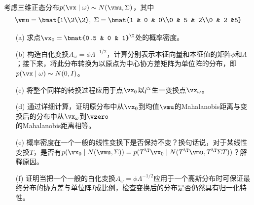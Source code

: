 \documentclass[reportComp]{thesis}
\begin{document}
\begin{question}[\textsection 2 Q23]
考虑三维正态分布$p(\vx\mid\omega)\thicksim N(\vmu,\Sigma)$，其中
\[\vmu=\bmat{1\\2\\2},\;\Sigma=\bmat{1 & 0 & 0\\0 & 5 & 2\\0 & 2 &5}\]
\begin{itemize}
	\item [(a)] 求点$\vx_0=\bmat{0.5 & 0 & 1}^\T$处的概率密度。
	\item [(b)] 构造白化变换$A_\omega=\phi\Lambda^{-1/2}$，计算分别表示本征向量和本征值的矩阵$\phi$和$\Lambda$；接下来，将此分布转换为以原点为中心协方差矩阵为单位阵的分布，即$p(\vx\mid\omega)\thicksim N(0,I)$。
	\item [(c)] 将整个同样的转换过程应用于点$\vx_0$以产生一变换点$\vx_\omega$。
	\item [(d)] 通过详细计算，证明原分布中从$\vx_0$到均值$\vmu$的Mahalanobis距离与变换后的分布中从$\vx_\omega$到$\vzero$\\的Mahalanobis距离相等。
	\item [(e)] 概率密度在一个一般的线性变换下是否保持不变？换句话说，对于某线性变换$T$，是否有$p(\vx_0\mid N(\vmu,\Sigma))=p(T^\T\vx_0\mid N(T^\T\vmu,T^\T\Sigma T))$？解释原因。
	\item [(f)] 证明当把一个一般的白化变换$A_\omega=\phi\Lambda^{-1/2}$应用于一个高斯分布时可保证最终分布的协方差与单位阵$I$成比例，检查变换后的分布是否仍然具有归一化特性。
\end{itemize}
\end{question}
\end{document}
